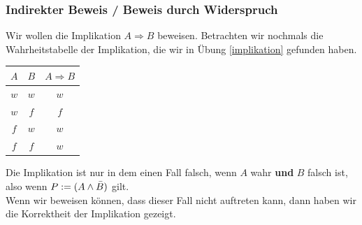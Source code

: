\subsubsection{Indirekter Beweis / Beweis durch Widerspruch}\label{subsubsec:widerspruch}
Wir wollen die Implikation $A\Rightarrow B$ beweisen. Betrachten wir nochmals die Wahrheitstabelle der Implikation, die wir in Übung \cref{implikation} gefunden haben.
\begin{table}[H]
	\begin{center}
		\begin{tabular}{c|c|c}
			$A$ & $B$ & $A\Rightarrow B$ \\ \hline
			$w$ & $w$ & $w$              \\
			$w$ & $f$ & $f$              \\
			$f$ & $w$ & $w$              \\
			$f$ & $f$ & $w$
		\end{tabular}
	\end{center}
\end{table}
\noindent
Die Implikation ist nur in dem einen Fall falsch, wenn $A$ wahr \textbf{und} $B$ falsch ist, also wenn $P:=(A\land \Bar{B})$ gilt.\\

\noindent
Wenn wir beweisen können, dass dieser Fall nicht auftreten kann, dann haben wir die Korrektheit der Implikation gezeigt.\\

